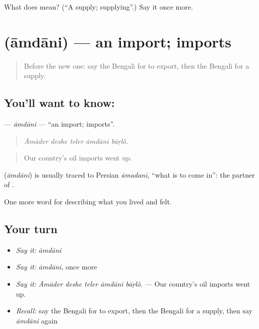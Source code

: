 \begin{tcolorbox}[breakable,colback=teal!4,colframe=teal!35!black,title={Before you move on}]
What does  mean? (\textquotedblleft{}A supply; supplying\textquotedblright{}.) Say it once more.
\end{tcolorbox}
\section[\texorpdfstring{\bn{আমদানি} (āmdāni)}{আমদানি (āmdāni)}]{ (āmdāni) — an import; imports}

\label{lesson:BN-C499-amdani}



\begin{quote}
Before the new one: say the Bengali for to export, then the Bengali for a supply.
\end{quote}

\subsection*{You'll want to know: }
\textbf{} — \emph{āmdāni} — \textquotedblleft{}an import; imports\textquotedblright{}.

\begin{quote}
    
\end{quote}

\begin{quote}
\emph{Āmāder deshe teler āmdāni bāṛlô.}
\end{quote}

\begin{quote}
Our country's oil imports went up.
\end{quote}

\begin{cousinweb}
\textbf{} (\emph{āmdāni}) is usually traced to Persian \emph{āmadanī}, \textquotedblleft{}what is to come in\textquotedblright{}: the partner of .
\end{cousinweb}

\begin{grammarlens}[title={What you've built}]
One more word for describing what you lived and felt.
\end{grammarlens}

\subsection*{Your turn}
\begin{itemize}
\raggedright
  \item \emph{Say it:} \emph{āmdāni}
  \item \emph{Say it:} \emph{āmdāni}, once more
  \item \emph{Say it:} \emph{Āmāder deshe teler āmdāni bāṛlô.} — Our country's oil imports went up.
  \item \emph{Recall:} say the Bengali for to export, then the Bengali for a supply, then say \emph{āmdāni} again
\end{itemize}

